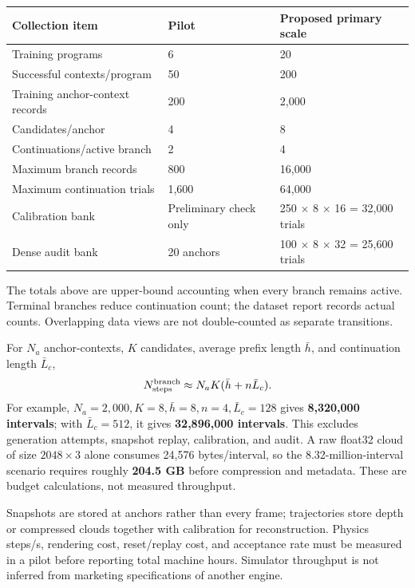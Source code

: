\documentclass[
  10pt,
]{article}
\begin{document}
\begin{longtable}[]{@{}lll@{}}
\toprule\noalign{}
Collection item & Pilot & Proposed primary scale \\
\midrule\noalign{}
\endhead
\bottomrule\noalign{}
\endlastfoot
Training programs & 6 & 20 \\
Successful contexts/program & 50 & 200 \\
Training anchor-context records & 200 & 2,000 \\
Candidates/anchor & 4 & 8 \\
Continuations/active branch & 2 & 4 \\
Maximum branch records & 800 & 16,000 \\
Maximum continuation trials & 1,600 & 64,000 \\
Calibration bank & Preliminary check only & 250 \(\times\) 8 \(\times\) 16 = 32,000 trials \\
Dense audit bank & 20 anchors & 100 \(\times\) 8 \(\times\) 32 = 25,600 trials \\
\end{longtable}

The totals above are upper-bound accounting when every branch remains active. Terminal branches reduce continuation count; the dataset report records actual counts. Overlapping data views are not double-counted as separate transitions.

For \(N_a\) anchor-contexts, \(K\) candidates, average prefix length \(\bar h\), and continuation length \(\bar L_c\),
\begin{equation}\label{eq:datacost}
N_{\rm steps}^{\rm branch}
\approx N_aK(\bar h+n\bar L_c).
\end{equation}
For example, \(N_a=2,000,K=8,\bar h=8,n=4,\bar L_c=128\) gives \textbf{8,320,000 intervals}; with \(\bar L_c=512\), it gives \textbf{32,896,000 intervals}. This excludes generation attempts, snapshot replay, calibration, and audit. A raw float32 cloud of size \(2048\times3\) alone consumes 24,576 bytes/interval, so the 8.32-million-interval scenario requires roughly \textbf{204.5 GB} before compression and metadata. These are budget calculations, not measured throughput.

Snapshots are stored at anchors rather than every frame; trajectories store depth or compressed clouds together with calibration for reconstruction. Physics steps/s, rendering cost, reset/replay cost, and acceptance rate must be measured in a pilot before reporting total machine hours. Simulator throughput is not inferred from marketing specifications of another engine.
\end{document}
